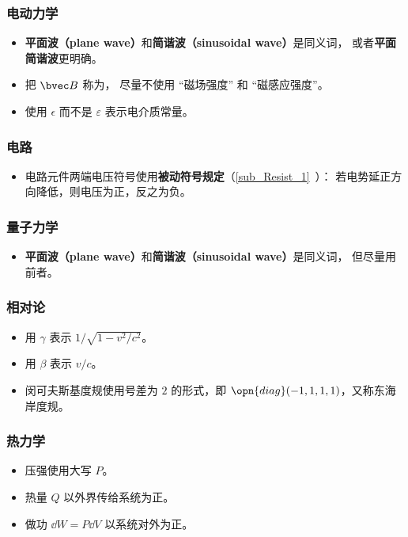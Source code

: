 \subsubsection{电动力学}
\begin{itemize}
\item \textbf{平面波（plane wave）}和\textbf{简谐波（sinusoidal wave）}是同义词， 或者\textbf{平面简谐波}更明确。
\item 把 $\bvec B$ 称为， 尽量不使用 “磁场强度” 和 “磁感应强度”。
\item 使用 $\epsilon$ 而不是 $\varepsilon$ 表示电介质常量。
\end{itemize}

\subsubsection{电路}
\begin{itemize}
\item 电路元件两端电压符号使用\textbf{被动符号规定}（\autoref{sub_Resist_1}~）： 若电势延正方向降低，则电压为正，反之为负。
\end{itemize}

\subsubsection{量子力学}
\begin{itemize}
\item \textbf{平面波（plane wave）}和\textbf{简谐波（sinusoidal wave）}是同义词， 但尽量用前者。
\end{itemize}

\subsubsection{相对论}
\begin{itemize}
\item 用 $\gamma$ 表示 $1/\sqrt{1 - v^2/c^2}$。
\item 用 $\beta$ 表示 $v/c$。
\item 闵可夫斯基度规使用号差为 $2$ 的形式，即 $\opn{diag}(-1, 1, 1, 1)$，又称东海岸度规。
\end{itemize}

\subsubsection{热力学}
\begin{itemize}
\item 压强使用大写 $P$。
\item 热量 $Q$ 以外界传给系统为正。
\item 做功 $\dd{W} = P\dd{V}$ 以系统对外为正。
\end{itemize}

